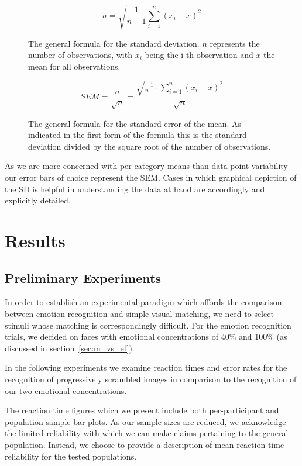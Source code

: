 	    \begin{multicols}{2}
		\begin{figure}[H]
		    \[ \sigma = \sqrt{\frac{1}{n-1} \sum\limits_{i=1}^n (x_i - \bar{x})^2} \]
		    \caption{The general formula for the standard deviation. $n$ represents the number of observations, with $x_i$ being the i-th observation and $\bar{x}$ the mean for all observations.}
		    \label{eq:m_sa_sd}
		\end{figure}
		\begin{figure}[H]
		    \[ SEM = \frac{\sigma}{\sqrt{n}} = \frac{\sqrt{\frac{1}{n-1} \sum\limits_{i=1}^n (x_i - \bar{x})^2}}{\sqrt{n}} \]
		    \caption{The general formula for the standard error of the mean. As indicated in the first form of the formula this is the standard deviation divided by the square root of the number of observations.}
		    \label{eq:m_sa_se}
		\end{figure}
	    \end{multicols}
	    
	    As we are more concerned with per-category means than data point variability our error bars of choice represent the SEM.
	    Cases in which graphical depiction of the SD is helpful in understanding the data at hand are accordingly and explicitly detailed.  
	    
\chapter{Results}                                                                          
    \section{Preliminary Experiments}\label{sec:r_pe}
	In order to establish an experimental paradigm which affords the comparison between emotion recognition and simple visual matching, we need to select stimuli whose matching is correspondingly difficult.
	For the emotion recognition trials, we decided on faces with emotional concentrations of 40\% and 100\% (as discussed in section~\ref{sec:m_vs_ef}).
	
	In the following experiments we examine reaction times and error rates for the recognition of progressively scrambled images in comparison to the recognition of our two emotional concentrations.
	
	The reaction time figures which we present include both per-participant and population sample bar plots.
	As our sample sizes are reduced, we acknowledge the limited reliability with which we can make claims pertaining to the general population. 
	Instead, we choose to provide a description of mean reaction time reliability for the tested populations.
	
